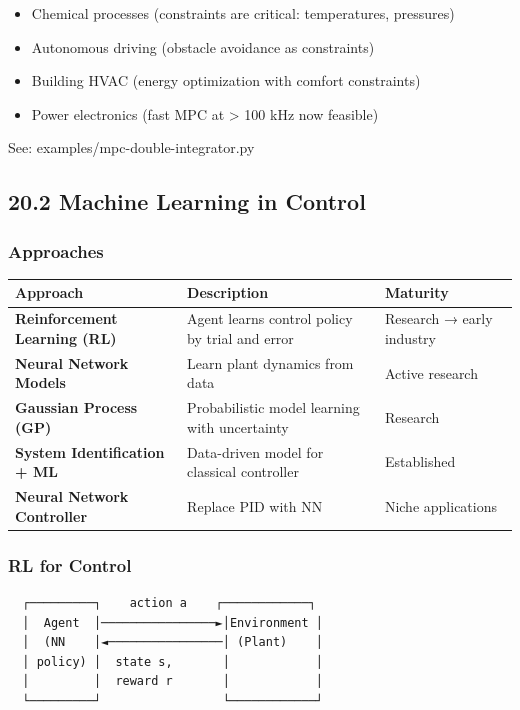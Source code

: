 \documentclass[11pt,a4paper]{book}
\begin{document}
\begin{itemize}
\begin{itemize}
\item Chemical processes (constraints are critical: temperatures, pressures)
\item Autonomous driving (obstacle avoidance as constraints)
\item Building HVAC (energy optimization with comfort constraints)
\item Power electronics (fast MPC at > 100 kHz now feasible)
\end{itemize}

See: examples/mpc-double-integrator.py

\medskip\noindent\hrulefill\medskip

\subsection{20.2 Machine Learning in Control}

\subsubsection{Approaches}

\begin{center}
\begin{tabular}{|l|l|l|}
\hline
Approach & Description & Maturity \\
\hline
\textbf{Reinforcement Learning (RL)} & Agent learns control policy by trial and error & Research → early industry \\
\textbf{Neural Network Models} & Learn plant dynamics from data & Active research \\
\textbf{Gaussian Process (GP)} & Probabilistic model learning with uncertainty & Research \\
\textbf{System Identification + ML} & Data-driven model for classical controller & Established \\
\textbf{Neural Network Controller} & Replace PID with NN & Niche applications \\
\hline
\end{tabular}
\end{center}

\subsubsection{RL for Control}

\begin{lstlisting}
  ┌─────────┐    action a    ┌────────────┐
  │  Agent  │────────────────►│Environment │
  │  (NN    │◄────────────────│ (Plant)    │
  │ policy) │  state s,       │            │
  │         │  reward r       │            │
  └─────────┘                 └────────────┘
  

\end{lstlisting}
\end{itemize}
\end{document}
